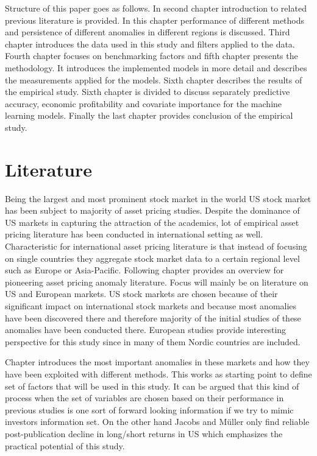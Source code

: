 \documentclass{article}
\begin{document}
Structure of this paper goes as follows. In second chapter introduction to related previous literature is provided. In this chapter performance of different methods and persistence of different anomalies in different regions is discussed. Third chapter introduces the data used in this study and filters applied to the data. Fourth chapter focuses on benchmarking factors and fifth chapter presents the methodology. It introduces the implemented models in more detail and describes the measurements applied for the models. Sixth chapter describes the results of the empirical study. Sixth chapter is divided to discuss separately predictive accuracy, economic profitability and covariate importance for the machine learning models. Finally the last chapter provides conclusion of the empirical study. \par

\section{Literature}\label{Literature}
Being the largest and most prominent stock market in the world US stock market has been subject to majority of asset pricing studies. Despite the dominance of US markets in capturing the attraction of the academics, lot of empirical asset pricing literature has been conducted in international setting as well. Characteristic for international asset pricing literature is that instead of focusing on single countries they aggregate stock market data to a certain regional level such as Europe or Asia-Pacific. Following chapter provides an overview for pioneering asset pricing anomaly literature. Focus will mainly be on literature on US and European markets. US stock markets are chosen because of their significant impact on international stock markets and because most anomalies have been discovered there and therefore majority of the initial studies of these anomalies have been conducted there. European studies provide interesting perspective for this study since in many of them Nordic countries are included. \par

Chapter introduces the most important anomalies in these markets and how they have been exploited with different methods. This works as starting point to define set of factors that will be used in this study. It can be argued that this kind of process when the set of variables are chosen based on their performance in previous studies is one sort of forward looking information if we try to mimic investors information set. On the other hand Jacobs and Müller \citeyear{JACOBS2020213} only find reliable post-publication decline in long/short returns in US which emphasizes the practical potential of this study. \par
\end{document}
